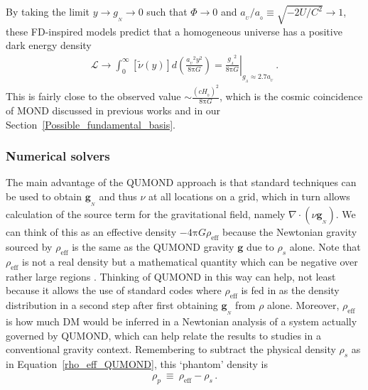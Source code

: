\documentclass[fleqn,usenatbib,useAMS]{mnras} %
\begin{document}
By taking the limit $y \to g_{_N} \to 0$ such that $\Phi \to 0$ and $a_{_U}/a_{_0} \equiv \sqrt{-2U/C^2} \to 1$, these FD-inspired models predict that a homogeneous universe has a positive dark energy density 
\begin{eqnarray}
    \mathcal{L} \to \int^\infty_{0} \left[ \widetilde{\nu}\left( y \right)  \right] d \left( \frac{{a_{_U}}^2 y^2}{8\mathrm{\pi} G} \right) = \left.\frac{{g_{_\Lambda}}^2}{8\mathrm{\pi}G}\right|_{g_{_\Lambda} \approx 2.7 a_{_U}} \, .
\end{eqnarray}
This is fairly close to the observed value $\sim \frac{\left(c H_{_0}\right)^2}{8\mathrm{\pi}G}$, which is the cosmic coincidence of MOND discussed in previous works \citep{Zhao_2007, Li_2009} and in our Section~\ref{Possible_fundamental_basis}.



\subsubsection{Numerical solvers}
\label{Numerical_solvers}

The main advantage of the QUMOND approach is that standard techniques can be used to obtain $\bm{g}_{_N}$ and thus $\nu$ at all locations on a grid, which in turn allows calculation of the source term for the gravitational field, namely $\nabla \cdot \left( \nu \bm{g}_{_N} \right)$. We can think of this as an effective density $-4 \mathrm{\pi} G \rho_{\text{eff}}$ because the Newtonian gravity sourced by $\rho_{\text{eff}}$ is the same as the QUMOND gravity $\bm{g}$ due to $\rho_s$ alone. Note that $\rho_{\text{eff}}$ is not a real density but a mathematical quantity which can be negative over rather large regions \citep{Banik_2018_EFE, Oria_2021}. Thinking of QUMOND in this way can help, not least because it allows the use of standard codes where $\rho_{\text{eff}}$ is fed in as the density distribution in a second step after first obtaining $\bm{g}_{_N}$ from $\rho$ alone. Moreover, $\rho_{\text{eff}}$ is how much DM would be inferred in a Newtonian analysis of a system actually governed by QUMOND, which can help relate the results to studies in a conventional gravity context. Remembering to subtract the physical density $\rho_s$ as in Equation~\ref{rho_eff_QUMOND}, this `phantom' density is
\begin{eqnarray}
	\rho_p ~\equiv~ \rho_{\text{eff}} - \rho_s \, .
\end{eqnarray}
\end{document}
